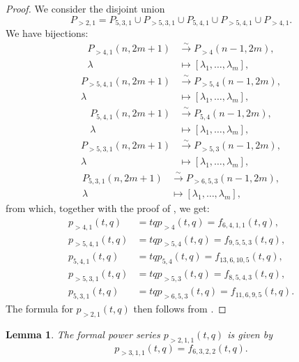\documentclass[a4paper, 12pt, reqno]{amsart}
\newtheorem{lemma}[theorem]{Lemma}
\theoremstyle{remark}
\begin{document}
\begin{proof}
  We consider the disjoint union
  \begin{equation*}
    P_{>2, 1} = P_{5, 3, 1} \cup P_{>5, 3, 1} \cup P_{5, 4, 1} \cup P_{>5, 4, 1} \cup P_{>4, 1}.
  \end{equation*}
  We have bijections:
  \begin{align*}
    P_{>4, 1}(n, 2m + 1) &\xrightarrow{\sim} P_{>4}(n - 1, 2m), \\
    \lambda &\mapsto [\lambda_1, \dots, \lambda_m],
  \end{align*}
  \begin{align*}
    P_{>5, 4, 1}(n, 2m + 1) &\xrightarrow{\sim} P_{>5, 4}(n - 1, 2m), \\
    \lambda &\mapsto [\lambda_1, \dots, \lambda_m],
  \end{align*}
  \begin{align*}
    P_{5, 4, 1}(n, 2m + 1) &\xrightarrow{\sim} P_{5, 4}(n - 1, 2m), \\
    \lambda &\mapsto [\lambda_1, \dots, \lambda_m],
  \end{align*}
  \begin{align*}
    P_{>5, 3, 1}(n, 2m + 1) &\xrightarrow{\sim} P_{>5, 3}(n - 1, 2m), \\
    \lambda &\mapsto [\lambda_1, \dots, \lambda_m],
  \end{align*}
  \begin{align*}
    P_{5, 3, 1}(n, 2m + 1) &\xrightarrow{\sim} P_{>6, 5, 3}(n - 1, 2m), \\
    \lambda &\mapsto [\lambda_1, \dots, \lambda_m],
  \end{align*}
  from which, together with the proof of , we get:
  \begin{align*}
    p_{>4, 1}(t, q) &= tqp_{>4}(t, q) = f_{6, 4, 1, 1}(t, q), \\
    p_{>5, 4, 1}(t, q) &= tqp_{>5, 4}(t, q) = f_{9, 5, 5, 3}(t, q), \\
    p_{5, 4, 1}(t, q) &= tqp_{5, 4}(t, q) = f_{13, 6, 10, 5}(t, q), \\
    p_{>5, 3, 1}(t, q) &= tqp_{>5, 3}(t, q) = f_{8, 5, 4, 3}(t, q), \\
    p_{5, 3, 1}(t, q) &= tqp_{>6, 5, 3}(t, q) = f_{11, 6, 9, 5}(t, q).
  \end{align*}
  The formula for $p_{>2, 1}(t, q)$ then follows from .
\end{proof}

\begin{lemma}
  \label{lmm:31}
  The formal power series $p_{>2, 1, 1}(t, q)$ is given by
  \begin{equation*}
    p_{>3, 1, 1}(t, q) = f_{6, 3, 2, 2}(t, q).
  \end{equation*}
\end{lemma}
\end{document}
